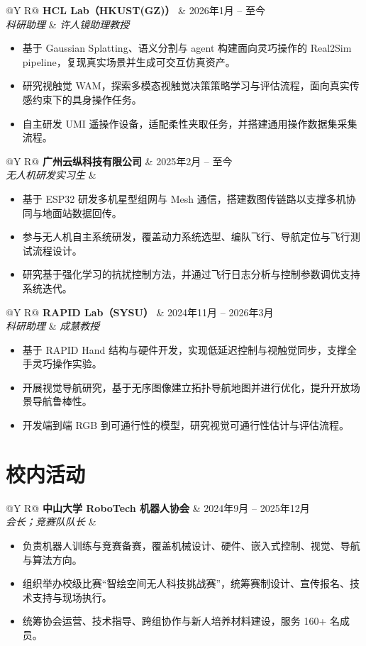\documentclass[10pt,letterpaper]{article}
\makeatletter
\newcommand{\cventry}[4]{%
  \begin{tabularx}{\textwidth}{@{}Y R@{}}
    \textbf{#1} & #2 \\
    \textit{#3} & \textit{#4}
  \end{tabularx}
}
\newenvironment{cvitems}
  {\begin{itemize}[leftmargin=1.2em,itemsep=1.5pt,topsep=2pt,parsep=0pt,partopsep=0pt]}
  {\end{itemize}}
\makeatother
\begin{document}
\cventry{HCL Lab（HKUST(GZ)）}
{2026年1月 -- 至今}
{科研助理}{许人镜助理教授}
\begin{cvitems}
  \item 基于 Gaussian Splatting、语义分割与 agent 构建面向灵巧操作的 Real2Sim pipeline，复现真实场景并生成可交互仿真资产。
  \item 研究视触觉 WAM，探索多模态视触觉决策策略学习与评估流程，面向真实传感约束下的具身操作任务。
  \item 自主研发 UMI 遥操作设备，适配柔性夹取任务，并搭建通用操作数据集采集流程。
\end{cvitems}

\cventry{广州云纵科技有限公司}
{2025年2月 -- 至今}
{无人机研发实习生}{}
\begin{cvitems}
  \item 基于 ESP32 研发多机星型组网与 Mesh 通信，搭建数图传链路以支撑多机协同与地面站数据回传。
  \item 参与无人机自主系统研发，覆盖动力系统选型、编队飞行、导航定位与飞行测试流程设计。
  \item 研究基于强化学习的抗扰控制方法，并通过飞行日志分析与控制参数调优支持系统迭代。
\end{cvitems}

\cventry{RAPID Lab（SYSU）}
{2024年11月 -- 2026年3月}
{科研助理}{成慧教授}
\begin{cvitems}
  \item 基于 RAPID Hand 结构与硬件开发，实现低延迟控制与视触觉同步，支撑全手灵巧操作实验。
  \item 开展视觉导航研究，基于无序图像建立拓扑导航地图并进行优化，提升开放场景导航鲁棒性。
  \item 开发端到端 RGB 到可通行性的模型，研究视觉可通行性估计与评估流程。
\end{cvitems}

\section*{校内活动}

\cventry{中山大学 RoboTech 机器人协会}
{2024年9月 -- 2025年12月}
{会长；竞赛队队长}{}
\begin{cvitems}
  \item 负责机器人训练与竞赛备赛，覆盖机械设计、硬件、嵌入式控制、视觉、导航与算法方向。
  \item 组织举办校级比赛“智绘空间无人科技挑战赛”，统筹赛制设计、宣传报名、技术支持与现场执行。
  \item 统筹协会运营、技术指导、跨组协作与新人培养材料建设，服务 160+ 名成员。
\end{cvitems}
\end{document}
